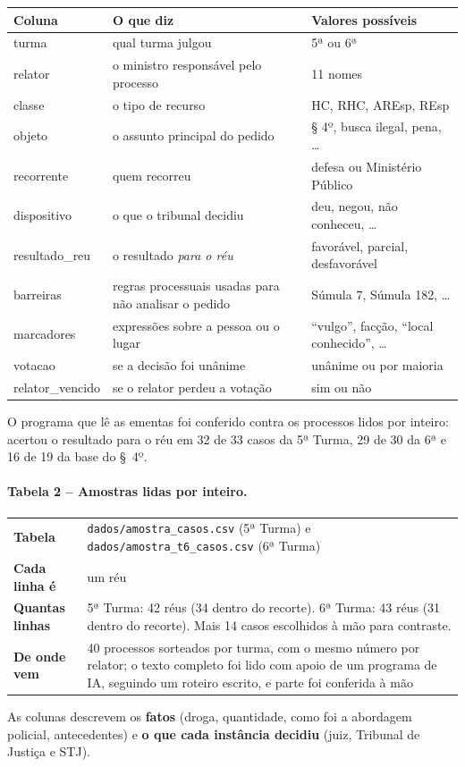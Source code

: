 \documentclass[11pt,a4paper]{article}
\newcommand{\ficha}[4]{%
\begin{center}\small
\begin{tabular}{>{\bfseries}p{3.2cm}p{11.5cm}}
\toprule
Tabela & #1 \\
Cada linha é & #2 \\
Quantas linhas & #3 \\
De onde vem & #4 \\
\bottomrule
\end{tabular}
\end{center}}
\begin{document}
\begin{center}\small
\begin{tabular}{>{\ttfamily}lp{6.6cm}p{5cm}}
\toprule
\normalfont\bfseries Coluna & \bfseries O que diz & \bfseries Valores possíveis \\
\midrule
turma & qual turma julgou & 5ª ou 6ª \\
relator & o ministro responsável pelo processo & 11 nomes \\
classe & o tipo de recurso & HC, RHC, AREsp, REsp \\
objeto & o assunto principal do pedido & § 4º, busca ilegal, pena, \ldots \\
recorrente & quem recorreu & defesa ou Ministério Público \\
dispositivo & o que o tribunal decidiu & deu, negou, não conheceu, \ldots \\
resultado\_reu & o resultado \emph{para o réu} & favorável, parcial, desfavorável \\
barreiras & regras processuais usadas para não analisar o pedido & Súmula 7, Súmula 182, \ldots \\
marcadores & expressões sobre a pessoa ou o lugar & ``vulgo'', facção, ``local conhecido'', \ldots \\
votacao & se a decisão foi unânime & unânime ou por maioria \\
relator\_vencido & se o relator perdeu a votação & sim ou não \\
\bottomrule
\end{tabular}
\end{center}

O programa que lê as ementas foi conferido contra os processos lidos por inteiro: acertou
o resultado para o réu em 32 de 33 casos da 5ª Turma, 29 de 30 da 6ª e 16 de 19 da base do
§~4º.

\paragraph{Tabela 2 -- Amostras lidas por inteiro.}
\ficha{\texttt{dados/amostra\_casos.csv} (5ª Turma) e \texttt{dados/amostra\_t6\_casos.csv} (6ª Turma)}
      {um réu}
      {5ª Turma: 42 réus (34 dentro do recorte). 6ª Turma: 43 réus (31 dentro do recorte). Mais 14 casos escolhidos à mão para contraste.}
      {40 processos sorteados por turma, com o mesmo número por relator; o texto completo foi lido com apoio de um programa de IA, seguindo um roteiro escrito, e parte foi conferida à mão}

As colunas descrevem os \textbf{fatos} (droga, quantidade, como foi a abordagem policial,
antecedentes) e \textbf{o que cada instância decidiu} (juiz, Tribunal de Justiça e STJ).
\end{document}
